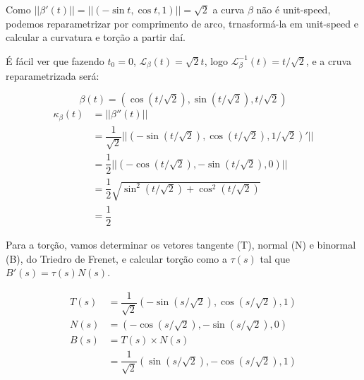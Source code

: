 \documentclass[12pt,letterpaper]{article}
\newcommand\lcur{\mathcal{L}}
\newcommand{\real}{\mathbb{R}}
\newcommand{\blue}[1]{{\color{blue}{#1}}}
\begin{document}
\begin{enumerate}
\begin{enumerate}[(a)]
		\blue{\item $\beta(t)=(\cos t,\sin t,t),t\in\real$}
		
		Como $||\beta'(t)||=||(-\sin t,\cos t,1)||=\sqrt2$ a curva $\beta$ não é unit-speed, podemos reparametrizar por comprimento de arco, trnasformá-la em unit-speed e calcular a curvatura e torção a partir daí. 
		
		É fácil ver que fazendo $t_0=0$, $\lcur_\beta(t)=\sqrt2t$, logo $\lcur^{-1}_\beta(t)=t/\sqrt2$, e a cruva reparametrizada será:
		
		$$\beta(t)=(\cos(t/\sqrt2),\sin(t/\sqrt2),t/\sqrt2)$$
		\begin{align*}
			\kappa_{\beta}(t)&=||\beta''(t)||\\
			&=\dfrac{1}{\sqrt2}||(-\sin (t/\sqrt2),\cos (t/\sqrt2),1/\sqrt2)'||\\
			&=\dfrac{1}{2}||(-\cos (t/\sqrt2),-\sin (t/\sqrt2),0)||\\
			&=\dfrac{1}{2}\sqrt{\sin^2(t/\sqrt2)+\cos^2(t/\sqrt2)}\\
			&=\dfrac{1}{2}
		\end{align*}
		
		Para a torção, vamos determinar os vetores tangente (T), normal (N) e binormal (B), do Triedro de Frenet, e calcular torção como a $\tau(s)$ tal que $B'(s)=\tau(s)N(s)$.
		
		\begin{align*}
			T(s)&=\dfrac{1}{\sqrt2}(-\sin (s/\sqrt2),\cos (s/\sqrt2),1)\\
			N(s)&=(-\cos (s/\sqrt2),-\sin (s/\sqrt2),0)\\
			B(s)&=T(s)\times N(s)\\&=\dfrac{1}{\sqrt2}(\sin(s/\sqrt2),-\cos(s/\sqrt2),1)
		\end{align*}
		\end{enumerate}
	
		
	\end{enumerate}
	\newpage



\end{document}
